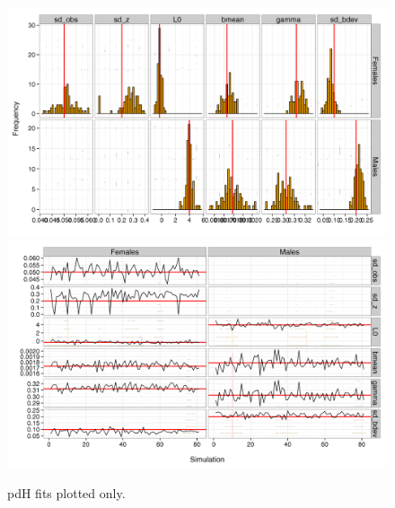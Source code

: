 \documentclass[11pt, a4paper]{article}
\begin{document}
\begin{figure}[!htbp]
  \centering
  \includegraphics[width=\linewidth]{../simulation/v3/results/SimPars.png}
  \includegraphics[width=\linewidth]{../simulation/v3/results/TracePars.png}
  \begin{quote}
    \caption{pdH fits plotted only.}
    \label{fig:sims1}
  \end{quote}
\end{figure}








%
%

\end{document}
